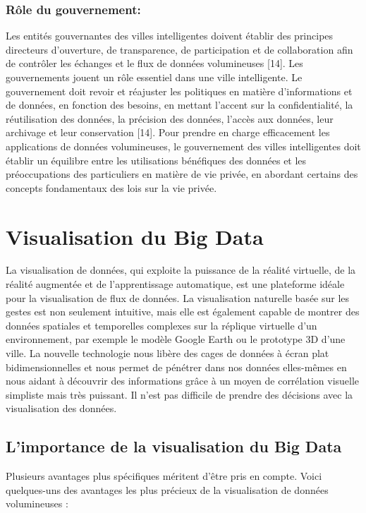 \documentclass[french, a4paper, 12pt]{report}
\begin{document}
\subsubsection{Rôle du gouvernement:}
Les entités gouvernantes des villes intelligentes doivent établir des principes directeurs d'ouverture, de transparence, de participation et de collaboration afin de contrôler les échanges et le flux de données volumineuses [14]. Les gouvernements jouent un rôle essentiel dans une ville intelligente. Le gouvernement doit revoir et réajuster les politiques en matière d'informations et de données, en fonction des besoins, en mettant l'accent sur la confidentialité, la réutilisation des données, la précision des données, l'accès aux données, leur archivage et leur conservation [14]. 
Pour prendre en charge efficacement les applications de données volumineuses, le gouvernement des villes intelligentes doit établir un équilibre entre les utilisations bénéfiques des données et les préoccupations des particuliers en matière de vie privée, en abordant certains des concepts fondamentaux des lois sur la vie privée.\\


\section{Visualisation du Big Data }
La visualisation de données, qui exploite la puissance de la réalité virtuelle, de la réalité augmentée et de l’apprentissage automatique, est une plateforme idéale pour la visualisation de flux de données. La visualisation naturelle basée sur les gestes est non seulement intuitive, mais elle est également capable de montrer des données spatiales et temporelles complexes sur la réplique virtuelle d’un environnement, par exemple le modèle Google Earth ou le prototype 3D d’une ville.
La nouvelle technologie nous libère des cages de données à écran plat bidimensionnelles et nous permet de pénétrer dans nos données elles-mêmes en nous aidant à découvrir des informations grâce à un moyen de corrélation visuelle simpliste mais très puissant. Il n’est pas difficile de prendre des décisions avec la visualisation des données.
\subsection{L’importance de la visualisation du Big Data}
Plusieurs avantages plus spécifiques méritent d’être pris en compte. Voici quelques-uns des avantages les plus précieux de la visualisation de données volumineuses :
\end{document}
